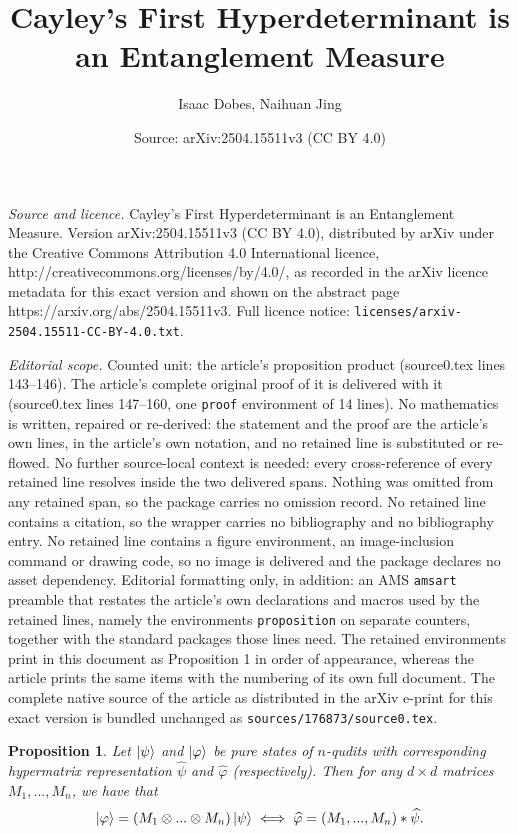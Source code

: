 \documentclass[10pt,a4paper]{amsart}
\title{Cayley's First Hyperdeterminant is an Entanglement Measure}
\author{Isaac Dobes, Naihuan Jing}
\date{Source: arXiv:2504.15511v3 (CC BY 4.0)}
\newtheorem{proposition}{Proposition}
\begin{document}
\maketitle

\noindent\emph{Source and licence.} Cayley's First Hyperdeterminant is an Entanglement Measure. Version arXiv:2504.15511v3 (CC BY 4.0), distributed by arXiv under the Creative Commons Attribution 4.0 International licence, http://creativecommons.org/licenses/by/4.0/, as recorded in the arXiv licence metadata for this exact version and shown on the abstract page https://arxiv.org/abs/2504.15511v3. Full licence notice: \texttt{licenses/arxiv-2504.15511-CC-BY-4.0.txt}.\par\smallskip

\noindent\textit{Editorial scope.} Counted unit: the article's proposition product (source0.tex lines 143--146). The article's complete original proof of it is delivered with it (source0.tex lines 147--160, one \texttt{proof} environment of 14 lines). No mathematics is written, repaired or re-derived: the statement and the proof are the article's own lines, in the article's own notation, and no retained line is substituted or re-flowed.  No further source-local context is needed: every cross-reference of every retained line resolves inside the two delivered spans.  Nothing was omitted from any retained span, so the package carries no omission record.  No retained line contains a citation, so the wrapper carries no bibliography and no bibliography entry.  No retained line contains a figure environment, an image-inclusion command or drawing code, so no image is delivered and the package declares no asset dependency.  Editorial formatting only, in addition: an AMS \texttt{amsart} preamble that restates the article's own declarations and macros used by the retained lines, namely the environments \texttt{proposition} on separate counters, together with the standard packages those lines need.  The retained environments print in this document as Proposition 1 in order of appearance, whereas the article prints the same items with the numbering of its own full document.  The complete native source of the article as distributed in the arXiv e-print for this exact version is bundled unchanged as \texttt{sources/176873/source0.tex}.
\begin{proposition}\label{Kronecker and multi lin mat product}
    Let $\ket{\psi}$ and $\ket{\varphi}$ be pure states of $n$-qudits with corresponding hypermatrix representation $\widehat{\psi}$ and $\widehat{\varphi}$ (respectively). Then for any $d\times d$ matrices $M_1,...,M_n$, we have that  
    \[\ket{\varphi} = (M_1\otimes...\otimes M_n)\ket{\psi} \iff \widehat{\varphi} = (M_1,...,M_n)*\widehat{\psi}.\]
\end{proposition}
\end{document}
